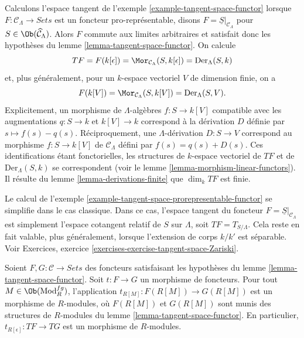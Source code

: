\begin{example}
\label{example-tangent-space-prorepresentable-functor}
Calculons l'espace tangent de l'exemple
\ref{example-tangent-space-functor} lorsque
$F : \mathcal{C}_\Lambda \to \textit{Sets}$ est un foncteur
pro-représentable, disons $F = \underline{S}|_{\mathcal{C}_\Lambda}$ pour
$S \in \Ob(\widehat{\mathcal{C}}_\Lambda)$. Alors $F$ commute aux limites
arbitraires et satisfait donc les hypothèses du lemme
\ref{lemma-tangent-space-functor}. On calcule
$$
TF = F(k[\epsilon]) = \Mor_{\mathcal{C}_\Lambda}(S, k[\epsilon])
= \text{Der}_\Lambda(S, k)
$$
et, plus généralement, pour un $k$-espace vectoriel $V$ de dimension finie,
on a
$$
F(k[V]) = \Mor_{\mathcal{C}_\Lambda}(S, k[V]) = \text{Der}_\Lambda(S, V).
$$
Explicitement, un morphisme de $\Lambda$-algèbres $f : S \to k[V]$
compatible avec les augmentations $q : S \to k$ et $k[V] \to k$ correspond
à la dérivation $D$ définie par $s \mapsto f(s) - q(s)$. Réciproquement, une
$\Lambda$-dérivation $D : S \to V$ correspond au morphisme
$f : S \to k[V]$ de $\mathcal{C}_\Lambda$ défini par
$f(s) = q(s) + D(s)$. Ces identifications étant fonctorielles, les structures
de $k$-espace vectoriel de $TF$ et de $\text{Der}_\Lambda(S, k)$ se
correspondent (voir le lemme \ref{lemma-morphism-linear-functors}). Il résulte
du lemme \ref{lemma-derivations-finite} que $\dim_k TF$ est finie.
\end{example}

\begin{example}
\label{example-tangent-space-classical-prorepresentable-functor}
Le calcul de l'exemple
\ref{example-tangent-space-prorepresentable-functor} se simplifie dans le cas
classique. Dans ce cas, l'espace tangent du foncteur
$F = \underline{S}|_{\mathcal{C}_\Lambda}$ est simplement l'espace cotangent
relatif de $S$ sur $\Lambda$, soit $TF = T_{S/\Lambda}$. Cela reste en fait
valable, plus généralement, lorsque l'extension de corps $k/k'$ est
séparable. Voir Exercices, exercice
\ref{exercises-exercise-tangent-space-Zariski}.
\end{example}

\begin{lemma}
\label{lemma-morphism-tangent-spaces}
Soient $F, G: \mathcal{C} \to \textit{Sets}$ des foncteurs satisfaisant les
hypothèses du lemme \ref{lemma-tangent-space-functor}. Soit $t : F \to G$ un
morphisme de foncteurs. Pour tout $M \in \Ob(\text{Mod}^{fg}_R)$,
l'application $t_{R[M]}: F(R[M]) \to G(R[M])$ est un morphisme de
$R$-modules, où $F(R[M])$ et $G(R[M])$ sont munis des structures de
$R$-modules du lemme \ref{lemma-tangent-space-functor}. En particulier,
$t_{R[\epsilon]} : TF \to TG$ est un morphisme de $R$-modules.
\end{lemma}

